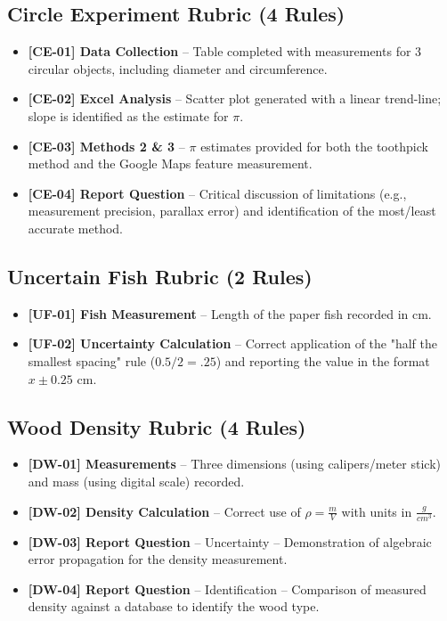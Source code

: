 \documentclass{article}
\begin{document}
\subsection*{Circle Experiment Rubric (4 Rules)}
\begin{itemize}
\item \textbf{ [CE-01] Data Collection } –  Table completed with measurements for 3 circular objects, including diameter and circumference.
\item \textbf{ [CE-02] Excel Analysis } –  Scatter plot generated with a linear trend-line; slope is identified as the estimate for $\pi$.
\item \textbf{ [CE-03] Methods 2 \& 3 } –  $\pi$ estimates provided for both the toothpick method and the Google Maps feature measurement.
\item \textbf{ [CE-04] Report Question } –  Critical discussion of limitations (e.g., measurement precision, parallax error) and identification of the most/least accurate method.
\end{itemize}

\subsection*{Uncertain Fish Rubric (2 Rules)}
\begin{itemize}
\item \textbf{ [UF-01] Fish Measurement } –  Length of the paper fish recorded in cm.
\item \textbf{ [UF-02] Uncertainty Calculation } –  Correct application of the "half the smallest spacing" rule ($ 0.5/2 = .25 $) and reporting the value in the format  $ x \pm 0.25 $ cm.
\end{itemize}

\subsection*{Wood Density Rubric (4 Rules)}
\begin{itemize}
\item \textbf{ [DW-01] Measurements } –  Three dimensions (using calipers/meter stick) and mass (using digital scale) recorded.
\item \textbf{ [DW-02] Density Calculation } –  Correct use of $ \rho = \frac {m}{V} $ with units in $ \frac { g }{ cm^3 } $.
\item \textbf{ [DW-03] Report Question } –  Uncertainty –  Demonstration of algebraic error propagation for the density measurement.
\item \textbf{ [DW-04] Report Question } –  Identification –  Comparison of measured density against a database to identify the wood type.
\end{itemize}
\end{document}
